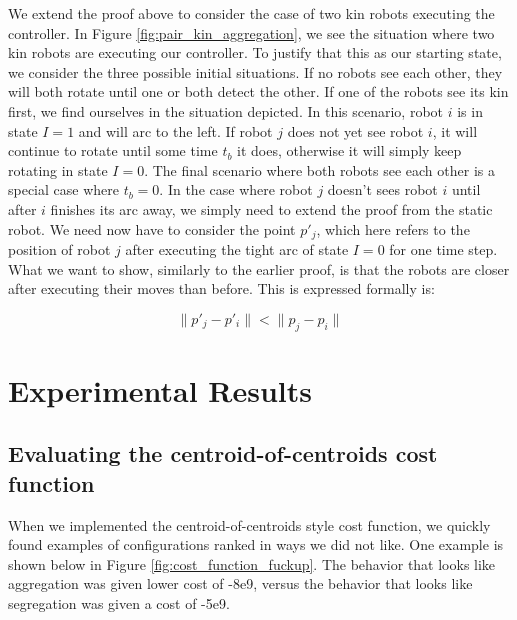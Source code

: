 \documentclass[conference]{IEEEtran}
\begin{document}
    We extend the proof above to consider the case of two kin robots executing the controller. In Figure \ref{fig:pair_kin_aggregation}, we see the situation where two kin robots are executing our controller. To justify that this as our starting state, we consider the three possible initial situations. If no robots see each other, they will both rotate until one or both detect the other. If one of the robots see its kin first, we find ourselves in the situation depicted. In this scenario, robot $i$ is in state $I=1$ and will arc to the left. If robot $j$ does not yet see robot $i$, it will continue to rotate until some time $t_b$ it does, otherwise it will simply keep rotating in state $I=0$. The final scenario where both robots see each other is a special case where $t_b=0$. In the case where robot $j$ doesn't sees robot $i$ until after $i$ finishes its arc away, we simply need to extend the proof from the static robot. We need now have to consider the point $p'_j$, which here refers to the position of robot $j$ after executing the tight arc of state $I=0$ for one time step. What we want to show, similarly to the earlier proof, is that the robots are closer after executing their moves than before. This is expressed formally is:

    $$\lVert p'_j - p'_i \rVert < \lVert p_j - p_i \rVert $$

\section{Experimental Results}

  \subsection{Evaluating the centroid-of-centroids cost function} \label{section:evaluting_cost_functions}

    When we implemented the centroid-of-centroids style cost function, we quickly found examples of configurations ranked in ways we did not like. One example is shown below in Figure \ref{fig:cost_function_fuckup}. The behavior that looks like aggregation was given lower cost of -8e9, versus the behavior that looks like segregation was given a cost of -5e9.
\end{document}

